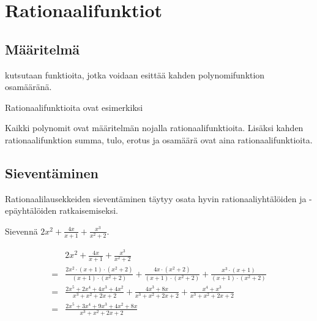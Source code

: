 \chapter{Rationaalifunktiot}

\section{Määritelmä}

 kutsutaan funktioita, jotka voidaan esittää kahden
polynomifunktion osamääränä.

\begin{esimerkki}
	Rationaalifunktioita ovat esimerkiksi
	\begin{alakohdat}
	\end{alakohdat}
\end{esimerkki}

Kaikki polynomit ovat määritelmän nojalla rationaalifunktioita. Lisäksi kahden rationaalifunktion summa, tulo, erotus ja osamäärä ovat aina rationaalifunktioita.

\section{Sieventäminen}

Rationaalilausekkeiden sieventäminen täytyy osata hyvin rationaaliyhtälöiden ja -epäyhtälöiden
ratkaisemiseksi.

\begin{esimerkki}
	Sievennä $2x^2 + \frac{4x}{x+1} + \frac{x^3}{x^2+2}$.
	\begin{esimratk}
		\begin{align*}
			  &2x^2 + \frac{4x}{x+1} + \frac{x^3}{x^2+2} \\
			= &\frac{2x^2 \cdot (x+1) \cdot (x^2+2)}{(x+1) \cdot (x^2+2)} + \frac{4x \cdot (x^2+2)}{(x+1) \cdot (x^2+2)} + \frac{x^3 \cdot (x+1)}{(x+1) \cdot (x^2+2)} \\
			= &\frac{2x^5 + 2x^4 + 4x^3 + 4x^2}{x^3+x^2+2x+2} + \frac{4x^3+8x}{x^3+x^2+2x+2} + \frac{x^4+x^3}{x^3+x^2+2x+2} \\
			= &\frac{2x^5+3x^4+9x^3+4x^2+8x}{x^3+x^2+2x+2}
		\end{align*}
	\end{esimratk}
\end{esimerkki}


